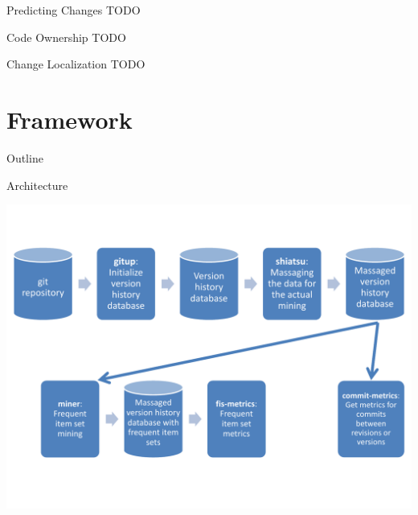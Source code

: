 \begin{frame}{Predicting Changes}
  TODO
\end{frame}


\begin{frame}{Code Ownership}
  TODO
\end{frame}


\begin{frame}{Change Localization}
  TODO
\end{frame}



\section{Framework}

\begin{frame}{Outline}
  \tableofcontents[current]
\end{frame}


\begin{frame}{Architecture}

  \begin{center}
    \includegraphics[width=\textwidth]{figures/miner-architecture}
  \end{center}

\end{frame}

